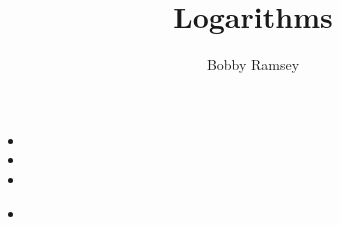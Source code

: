 \documentclass{ximera}
\author{Bobby Ramsey}
\title{Logarithms}
\begin{document}
\begin{abstract}
\end{abstract}
\maketitle


\begin{objectives}
	\item 
		\begin{itemize}
			\item 
			\item 
			\item 
		\end{itemize}
	
	\item
		\begin{itemize}
			\item 
		\end{itemize}
\end{objectives}
\end{document}
